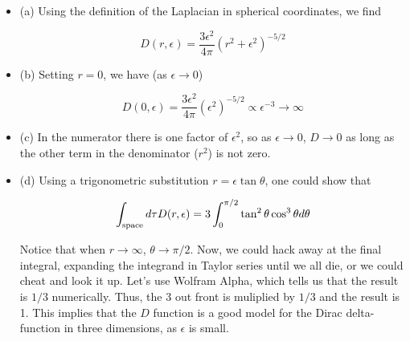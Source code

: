\documentclass[10pt]{article}
\begin{document}
\begin{itemize}
\item (a) Using the definition of the Laplacian in spherical coordinates, we find

\begin{equation}
D(r,\epsilon) = \frac{3\epsilon^2}{4\pi} (r^2+\epsilon^2)^{-5/2}
\end{equation}

\item (b) Setting $r = 0$, we have (as $\epsilon \to 0$)

\begin{equation}
D(0,\epsilon) = \frac{3\epsilon^2}{4\pi} (\epsilon^2)^{-5/2} \propto \epsilon^{-3} \to \infty
\end{equation}

\item (c) In the numerator there is one factor of $\epsilon^2$, so as $\epsilon \to 0$, $D \to 0$ as long as the other term in the denominator ($r^2$) is not zero.

\item (d) Using a trigonometric substitution $r = \epsilon \tan\theta$, one could show that

\begin{equation}
\int_{\rm space} d\tau D(r,\epsilon) = 3 \int_{0}^{\pi/2} \tan^2\theta \cos^3\theta d\theta
\end{equation}

Notice that when $r \to \infty$, $\theta \to \pi/2$. Now, we could hack away at the final integral, expanding the integrand in Taylor series until we all die, or we could cheat and look it up.  Let's use Wolfram Alpha, which tells us that the result is $1/3$ numerically. Thus, the 3 out front is muliplied by $1/3$ and the result is 1.  This implies that the $D$ function is a good model for the Dirac delta-function in three dimensions, as $\epsilon$ is small.

\end{itemize}
\end{document}
